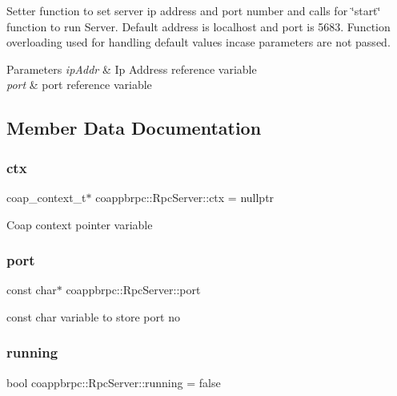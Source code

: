Setter function to set server ip address and port number and calls for \char`\"{}start\char`\"{} function to run Server. Default address is localhost and port is 5683. Function overloading used for handling default values incase parameters are not passed. 


\begin{DoxyParams}{Parameters}
{\em ip\+Addr} & Ip Address reference variable \\
\hline
{\em port} & port reference variable \\
\hline
\end{DoxyParams}


\subsection{Member Data Documentation}
\mbox{\label{classcoappbrpc_1_1RpcServer_a34a0db66e265d8986dea6d9e360a7ca3}} 
\subsubsection{\texorpdfstring{ctx}{ctx}}
{\footnotesize\ttfamily coap\+\_\+context\+\_\+t$\ast$ coappbrpc\+::\+Rpc\+Server\+::ctx = nullptr}

Coap context pointer variable \mbox{\label{classcoappbrpc_1_1RpcServer_a9fec802c5d77b168560d14b73fc988e1}} 
\subsubsection{\texorpdfstring{port}{port}}
{\footnotesize\ttfamily const char$\ast$ coappbrpc\+::\+Rpc\+Server\+::port}

const char variable to store port no \mbox{\label{classcoappbrpc_1_1RpcServer_a5110ce6a1447e421359982aff15744e2}} 
\subsubsection{\texorpdfstring{running}{running}}
{\footnotesize\ttfamily bool coappbrpc\+::\+Rpc\+Server\+::running = false}

